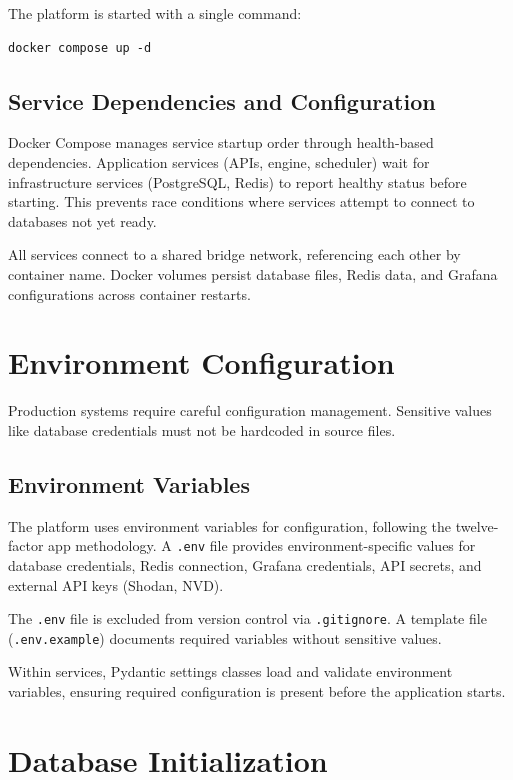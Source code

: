 \documentclass[a4paper,12pt]{report}
\begin{document}
The platform is started with a single command:
\begin{verbatim}
docker compose up -d
\end{verbatim}

\subsection{Service Dependencies and Configuration}

Docker Compose manages service startup order through health-based dependencies. Application services (APIs, engine, scheduler) wait for infrastructure services (PostgreSQL, Redis) to report healthy status before starting. This prevents race conditions where services attempt to connect to databases not yet ready.\hfill \break

All services connect to a shared bridge network, referencing each other by container name. Docker volumes persist database files, Redis data, and Grafana configurations across container restarts.\hfill \break

\section{Environment Configuration}

Production systems require careful configuration management. Sensitive values like database credentials must not be hardcoded in source files.

\subsection{Environment Variables}

The platform uses environment variables for configuration, following the twelve-factor app methodology. A \texttt{.env} file provides environment-specific values for database credentials, Redis connection, Grafana credentials, API secrets, and external API keys (Shodan, NVD).\hfill \break

The \texttt{.env} file is excluded from version control via \texttt{.gitignore}. A template file (\texttt{.env.example}) documents required variables without sensitive values.\hfill \break

Within services, Pydantic settings classes load and validate environment variables, ensuring required configuration is present before the application starts.\hfill \break

\section{Database Initialization}
\end{document}
